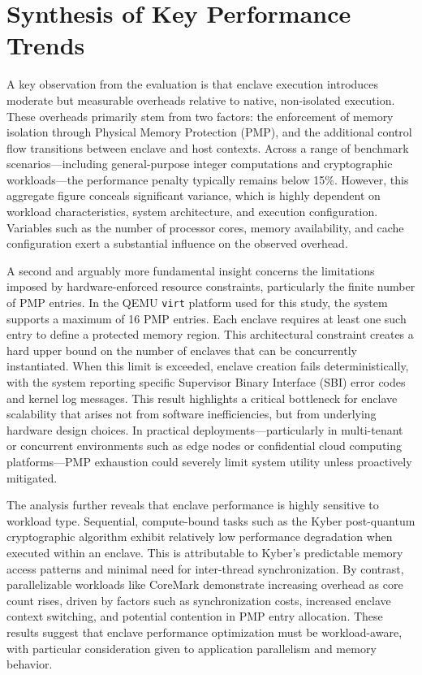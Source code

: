 \section{Synthesis of Key Performance Trends}

A key observation from the evaluation is that enclave execution introduces moderate but measurable overheads relative to native, non-isolated execution. These overheads primarily stem from two factors: the enforcement of memory isolation through Physical Memory Protection (PMP), and the additional control flow transitions between enclave and host contexts. Across a range of benchmark scenarios—including general-purpose integer computations and cryptographic workloads—the performance penalty typically remains below 15\%. However, this aggregate figure conceals significant variance, which is highly dependent on workload characteristics, system architecture, and execution configuration. Variables such as the number of processor cores, memory availability, and cache configuration exert a substantial influence on the observed overhead.

A second and arguably more fundamental insight concerns the limitations imposed by hardware-enforced resource constraints, particularly the finite number of PMP entries. In the QEMU \texttt{virt} platform used for this study, the system supports a maximum of 16 PMP entries. Each enclave requires at least one such entry to define a protected memory region. This architectural constraint creates a hard upper bound on the number of enclaves that can be concurrently instantiated. When this limit is exceeded, enclave creation fails deterministically, with the system reporting specific Supervisor Binary Interface (SBI) error codes and kernel log messages. This result highlights a critical bottleneck for enclave scalability that arises not from software inefficiencies, but from underlying hardware design choices. In practical deployments—particularly in multi-tenant or concurrent environments such as edge nodes or confidential cloud computing platforms—PMP exhaustion could severely limit system utility unless proactively mitigated.

The analysis further reveals that enclave performance is highly sensitive to workload type. Sequential, compute-bound tasks such as the Kyber post-quantum cryptographic algorithm exhibit relatively low performance degradation when executed within an enclave. This is attributable to Kyber’s predictable memory access patterns and minimal need for inter-thread synchronization. By contrast, parallelizable workloads like CoreMark demonstrate increasing overhead as core count rises, driven by factors such as synchronization costs, increased enclave context switching, and potential contention in PMP entry allocation. These results suggest that enclave performance optimization must be workload-aware, with particular consideration given to application parallelism and memory behavior.

